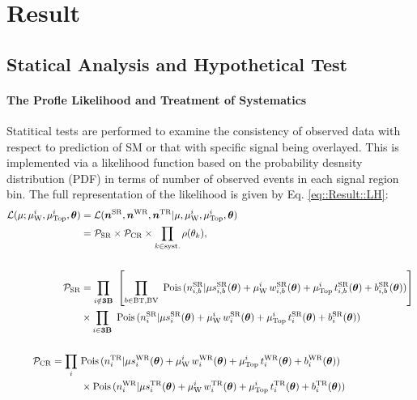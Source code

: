 \clearpage

\section{Result}  \label{sec::Result}

\subsection{Statical Analysis and Hypothetical Test} \label{sec::Result::statistics}
\paragraph{The Profle Likelihood and Treatment of Systematics}
Statitical tests are performed to examine the consistency of observed data with respect to prediction of SM or that with specific signal being overlayed. This is implemented via a likelihood function based on the probability desnsity distribution (PDF) in terms of number of observed events in each signal region bin. The full representation of the likelihood is given by Eq. \ref{eq::Result::LH}:
\begin{align}
 \mathcal{L} (\mu; \muw, \mutop, \bmtheta)  
 & =  \mathcal{L} ( \bm{n}^{\SR}, \bm{n}^{\WR}, \bm{n}^{\TR} | \mu, \muw, \mutop, \bmtheta) \nn \\
  & = \mathcal{P}_{\SR} \times \mathcal{P}_{\CR}  \times \prod_{k\in \mathrm{syst.}} \rho(\theta_k), \nn \\
& \nn \\
% 
  \mathcal{P}_{\SR} & = \prod_{i\notin \textbf{3B}} \,\, \left[ \prod_{b \in \mathrm{BT}, \mathrm{BV}} \,\, \mathrm{Pois}\, (n^{\SR}_{i,b} | \mu s^{\SR}_{i,b}(\bmtheta) + \muw \,  w^{\SR}_{i,b}(\bmtheta) + \mutop \,  t^{\SR}_{i,b}(\bmtheta) + b^{\SR}_{i,b}(\bmtheta)) \right] \nn \\
& \times \prod_{i\in \textbf{3B}} \,\, \mathrm{Pois}\, (n^{\SR}_i | \mu s^{\SR}_i(\bmtheta) + \muw \,  w^{\SR}_i(\bmtheta) + \mutop \,  t^{\SR}_i(\bmtheta) + b^{\SR}_i(\bmtheta))  \nn \\
& \nn\\
%
  \mathcal{P}_{\CR} =  \prod_i \,\,
  &        \mathrm{Pois}\, (n^{\TR}_i | \mu s^{\WR}_i(\bmtheta) + \muw \,  w^{\WR}_i(\bmtheta) + \mutop \,  t^{\WR}_i(\bmtheta) + b^{\WR}_i(\bmtheta))  \nn \\
  & \times \mathrm{Pois}\, (n^{\WR}_i | \mu s^{\TR}_i(\bmtheta) + \muw \,  w^{\TR}_i(\bmtheta) + \mutop \,  t^{\TR}_i(\bmtheta) + b^{\TR}_i(\bmtheta))   
\label{eq::Result::LH}
\end{align}
